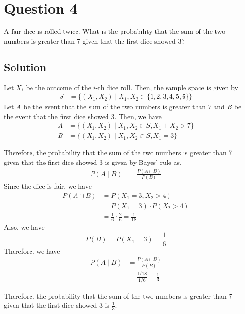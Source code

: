 \section*{Question 4}

A fair dice is rolled twice.
What is the probability that the sum of the two numbers is greater than 7 given that the first dice showed 3?

\subsection*{Solution}

Let \( X_i \) be the outcome of the \( i \)-th dice roll.
Then, the sample space is given by
\begin{align*}
    S & = \{ (X_1, X_2) \mid X_1, X_2 \in \{ 1, 2, 3, 4, 5, 6 \} \}
\end{align*}
Let \( A \) be the event that the sum of the two numbers is greater than 7 and \( B \) be the event that the first dice showed 3.
Then, we have
\begin{align*}
    A & = \{ (X_1, X_2) \mid X_1, X_2 \in S, X_1 + X_2 > 7 \} \\
    B & = \{ (X_1, X_2) \mid X_1, X_2 \in S, X_1 = 3 \}
\end{align*}

Therefore, the probability that the sum of the two numbers is greater than 7 given that the first dice showed 3 is given by Bayes' rule as,
\begin{align*}
    P(A \mid B) & = \frac{P(A \cap B)}{P(B)}
\end{align*}
Since the dice is fair, we have
\begin{align*}
    P(A \cap B)
     & = P(X_1 = 3, X_2 > 4)           \\
     & = P(X_1 = 3) \cdot P(X_2 > 4)   \\
     & = \frac{1}{6} \cdot \frac{2}{6}
    = \frac{1}{18}
\end{align*}
Also, we have
\begin{equation*}
    P(B) = P(X_1 = 3) = \frac{1}{6}
\end{equation*}
Therefore, we have
\begin{align*}
    P(A \mid B)
     & = \frac{P(A \cap B)}{P(B)} \\
     & = \frac{1/18}{1/6}
    = \frac{1}{3}
\end{align*}

Therefore, the probability that the sum of the two numbers is greater than 7 given that the first dice showed 3 is \(\frac{1}{3}\).
